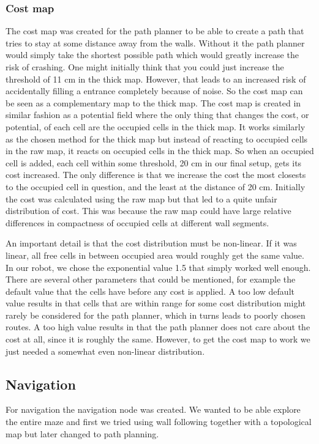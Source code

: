 \subsubsection{Cost map}
The cost map was created for the path planner to be able to create a path that tries to stay at some distance away from the walls. Without it the path planner would simply take the shortest possible path which would greatly increase the risk of crashing. One might initially think that you could just increase the threshold of 11 cm in the thick map. However, that leads to an increased risk of accidentally filling a entrance completely because of noise. So the cost map can be seen as a complementary map to the thick map. The cost map is created in similar fashion as a potential field where the only thing that changes the cost, or potential, of each cell are the occupied cells in the thick map. It works similarly as the chosen method for the thick map but instead of reacting to occupied cells in the raw map, it reacts on occupied cells in the thick map. So when an occupied cell is added, each cell within some threshold, 20 cm in our final setup, gets its cost increased. The only difference is that we increase the cost the most closests to the occupied cell in question, and the least at the distance of 20 cm. Initially the cost was calculated using the raw map but that led to a quite unfair distribution of cost. This was because the raw map could have large relative differences in compactness of occupied cells at different wall segments. 

An important detail is that the cost distribution must be non-linear. If it was linear, all free cells in between occupied area would roughly get the same value. In our robot, we chose the exponential value 1.5 that simply worked well enough. There are several other parameters that could be mentioned, for example the default value that the cells have before any cost is applied. A too low default value results in that cells that are within range for some cost distribution might rarely be considered for the path planner, which in turns leads to poorly chosen routes. A too high value results in that the path planner does not care about the cost at all, since it is roughly the same. However, to get the cost map to work we just needed a somewhat even non-linear distribution. 


\subsection{Navigation}
For navigation the navigation node was created. We wanted to be able explore the entire maze and first we tried using wall following together with a topological map but later changed to path planning. 

